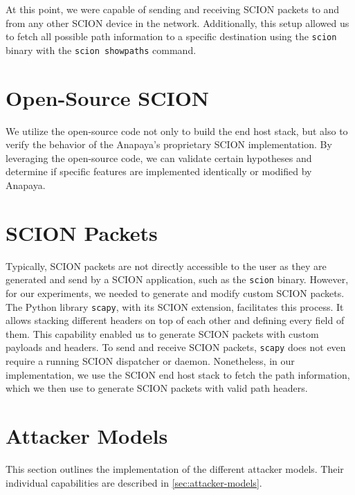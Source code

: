 At this point, we were capable of sending and receiving SCION packets to and from any other SCION device in the network.
Additionally, this setup allowed us to fetch all possible path information to a specific destination using the \texttt{scion} binary with the \texttt{scion showpaths} command.


\section{Open-Source SCION}
We utilize the open-source code not only to build the end host stack, but also to verify the behavior of the Anapaya's proprietary SCION implementation.
By leveraging the open-source code, we can validate certain hypotheses and determine if specific features are implemented identically or modified by Anapaya.


\section{SCION Packets}
\label{sec:impl:SCIONpackets}
Typically, SCION packets are not directly accessible to the user as they are generated and send by a SCION application, such as the \texttt{scion} binary.
However, for our experiments, we needed to generate and modify custom SCION packets.
The Python library \texttt{scapy}, with its SCION extension, facilitates this process.
It allows stacking different headers on top of each other and defining every field of them.
This capability enabled us to generate SCION packets with custom payloads and headers.
To send and receive SCION packets, \texttt{scapy} does not even require a running SCION dispatcher or daemon.
Nonetheless, in our implementation, we use the SCION end host stack to fetch the path information, which we then use to generate SCION packets with valid path headers.




\section{Attacker Models}
\label{sec:impl:attackerModel}

This section outlines the implementation of the different attacker models.
Their individual capabilities are described in \cref{sec:attacker-models}.

